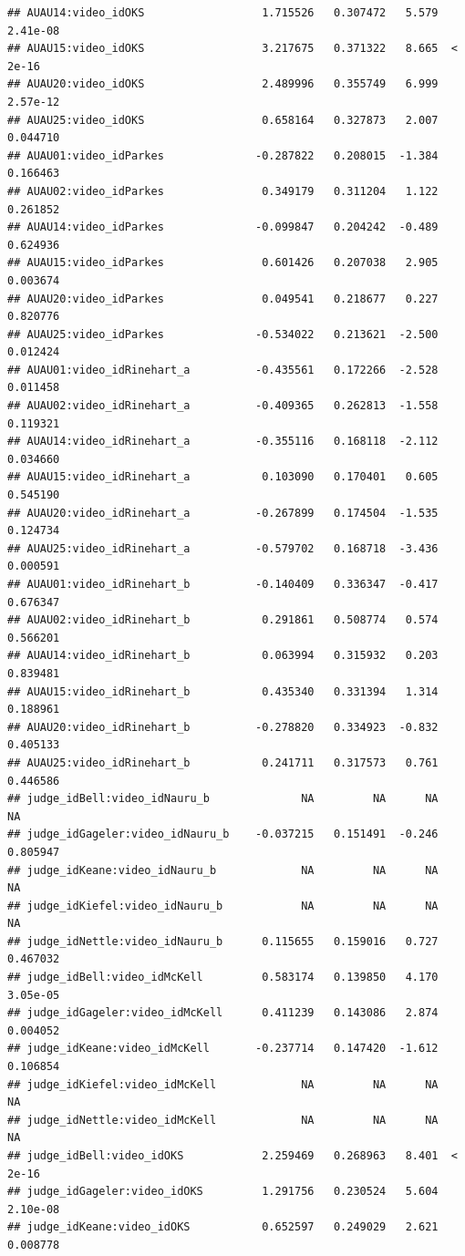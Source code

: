 \documentclass{monashthesis}
\begin{document}
\begin{verbatim}
## AUAU14:video_idOKS                  1.715526   0.307472   5.579 2.41e-08
## AUAU15:video_idOKS                  3.217675   0.371322   8.665  < 2e-16
## AUAU20:video_idOKS                  2.489996   0.355749   6.999 2.57e-12
## AUAU25:video_idOKS                  0.658164   0.327873   2.007 0.044710
## AUAU01:video_idParkes              -0.287822   0.208015  -1.384 0.166463
## AUAU02:video_idParkes               0.349179   0.311204   1.122 0.261852
## AUAU14:video_idParkes              -0.099847   0.204242  -0.489 0.624936
## AUAU15:video_idParkes               0.601426   0.207038   2.905 0.003674
## AUAU20:video_idParkes               0.049541   0.218677   0.227 0.820776
## AUAU25:video_idParkes              -0.534022   0.213621  -2.500 0.012424
## AUAU01:video_idRinehart_a          -0.435561   0.172266  -2.528 0.011458
## AUAU02:video_idRinehart_a          -0.409365   0.262813  -1.558 0.119321
## AUAU14:video_idRinehart_a          -0.355116   0.168118  -2.112 0.034660
## AUAU15:video_idRinehart_a           0.103090   0.170401   0.605 0.545190
## AUAU20:video_idRinehart_a          -0.267899   0.174504  -1.535 0.124734
## AUAU25:video_idRinehart_a          -0.579702   0.168718  -3.436 0.000591
## AUAU01:video_idRinehart_b          -0.140409   0.336347  -0.417 0.676347
## AUAU02:video_idRinehart_b           0.291861   0.508774   0.574 0.566201
## AUAU14:video_idRinehart_b           0.063994   0.315932   0.203 0.839481
## AUAU15:video_idRinehart_b           0.435340   0.331394   1.314 0.188961
## AUAU20:video_idRinehart_b          -0.278820   0.334923  -0.832 0.405133
## AUAU25:video_idRinehart_b           0.241711   0.317573   0.761 0.446586
## judge_idBell:video_idNauru_b              NA         NA      NA       NA
## judge_idGageler:video_idNauru_b    -0.037215   0.151491  -0.246 0.805947
## judge_idKeane:video_idNauru_b             NA         NA      NA       NA
## judge_idKiefel:video_idNauru_b            NA         NA      NA       NA
## judge_idNettle:video_idNauru_b      0.115655   0.159016   0.727 0.467032
## judge_idBell:video_idMcKell         0.583174   0.139850   4.170 3.05e-05
## judge_idGageler:video_idMcKell      0.411239   0.143086   2.874 0.004052
## judge_idKeane:video_idMcKell       -0.237714   0.147420  -1.612 0.106854
## judge_idKiefel:video_idMcKell             NA         NA      NA       NA
## judge_idNettle:video_idMcKell             NA         NA      NA       NA
## judge_idBell:video_idOKS            2.259469   0.268963   8.401  < 2e-16
## judge_idGageler:video_idOKS         1.291756   0.230524   5.604 2.10e-08
## judge_idKeane:video_idOKS           0.652597   0.249029   2.621 0.008778

\end{verbatim}
\end{document}
